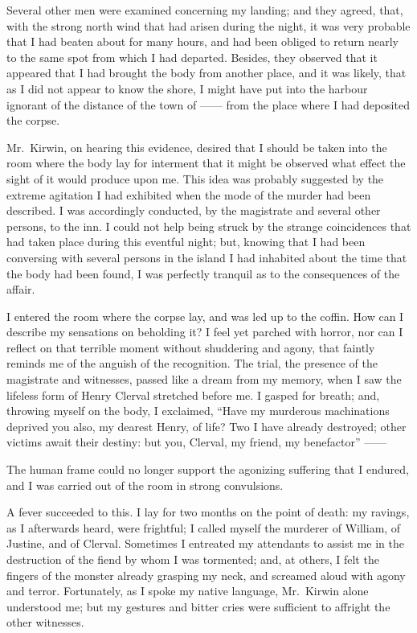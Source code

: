 Several other men were examined
concerning my landing; and they
agreed, that, with the strong north
wind that had arisen during the night,
it was very probable that I had beaten
about for many hours, and had been
obliged to return nearly to the same
spot from which I had departed. Besides,
they observed that it appeared
that I had brought the body from another
place, and it was likely, that as
I did not appear to know the shore, I
might have put into the harbour ignorant
of the distance of the town of  ------  from
the place where I had deposited
the corpse.

Mr.~Kirwin, on hearing this evidence,
desired that I should be taken
into the room where the body lay for
interment that it might be observed
what effect the sight of it would produce
upon me. This idea was probably
suggested by the extreme agitation
I had exhibited when the mode of the
murder had been described. I was accordingly
conducted, by the magistrate
and several other persons, to the inn.
I could not help being struck by the
strange coincidences that had taken
place during this eventful night; but,
knowing that I had been conversing
with several persons in the island I
had inhabited about the time that the
body had been found, I was perfectly
tranquil as to the consequences of the
affair.

I entered the room where the corpse
lay, and was led up to the coffin. How
can I describe my sensations on beholding
it? I feel yet parched with
horror, nor can I reflect on that terrible
moment without shuddering and agony,
that faintly reminds me of the anguish
of the recognition. The trial, the
presence of the magistrate and witnesses,
passed like a dream from my
memory, when I saw the lifeless form
of Henry Clerval stretched before me.
I gasped for breath; and, throwing
myself on the body, I exclaimed,
``Have my murderous machinations
deprived you also, my dearest Henry,
of life? Two I have already destroyed;
other victims await their destiny:
but you, Clerval, my friend, my benefactor'' ------

The human frame could no longer
support the agonizing suffering that I
endured, and I was carried out of the
room in strong convulsions.

A fever succeeded to this. I lay for
two months on the point of death:
my ravings, as I afterwards heard, were
frightful; I called myself the murderer
of William, of Justine, and of Clerval.
Sometimes I entreated my attendants
to assist me in the destruction of the
fiend by whom I was tormented; and,
at others, I felt the fingers of the monster
already grasping my neck, and
screamed aloud with agony and terror.
Fortunately, as I spoke my native language,
Mr.~Kirwin alone understood
me; but my gestures and bitter cries
were sufficient to affright the other
witnesses.

